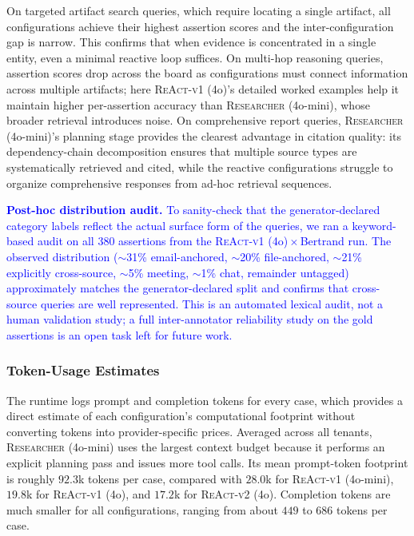 \noindent On targeted artifact search queries, which require locating a single artifact, all configurations achieve their highest assertion scores and the inter-configuration gap is narrow. This confirms that when evidence is concentrated in a single entity, even a minimal reactive loop suffices. On multi-hop reasoning queries, assertion scores drop across the board as configurations must connect information across multiple artifacts; here \textsc{ReAct-v1} (4o)'s detailed worked examples help it maintain higher per-assertion accuracy than \textsc{Researcher} (4o-mini), whose broader retrieval introduces noise. On comprehensive report queries, \textsc{Researcher} (4o-mini)'s planning stage provides the clearest advantage in citation quality: its dependency-chain decomposition ensures that multiple source types are systematically retrieved and cited, while the reactive configurations struggle to organize comprehensive responses from ad-hoc retrieval sequences.

\textcolor{blue}{\textbf{Post-hoc distribution audit.} To sanity-check that the generator-declared category labels reflect the actual surface form of the queries, we ran a keyword-based audit on all 380 assertions from the \textsc{ReAct-v1} (4o)\,$\times$\,Bertrand run. The observed distribution ($\sim$31\% email-anchored, $\sim$20\% file-anchored, $\sim$21\% explicitly cross-source, $\sim$5\% meeting, $\sim$1\% chat, remainder untagged) approximately matches the generator-declared split and confirms that cross-source queries are well represented. This is an automated lexical audit, not a human validation study; a full inter-annotator reliability study on the gold assertions is an open task left for future work.}

\subsubsection{Token-Usage Estimates}
\label{sec:token-usage}

The runtime logs prompt and completion tokens for every case, which provides a direct estimate of each configuration's computational footprint without converting tokens into provider-specific prices. Averaged across all tenants, \textsc{Researcher} (4o-mini) uses the largest context budget because it performs an explicit planning pass and issues more tool calls. Its mean prompt-token footprint is roughly $92.3$k tokens per case, compared with $28.0$k for \textsc{ReAct-v1} (4o-mini), $19.8$k for \textsc{ReAct-v1} (4o), and $17.2$k for \textsc{ReAct-v2} (4o). Completion tokens are much smaller for all configurations, ranging from about $449$ to $686$ tokens per case.

